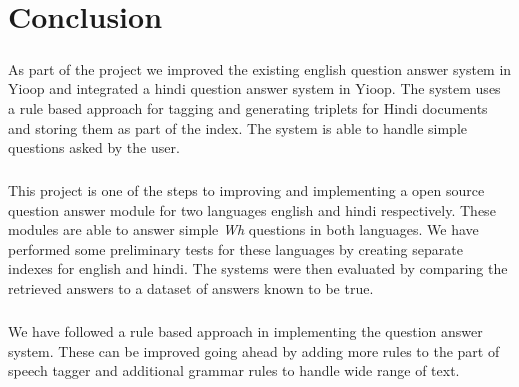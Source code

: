\chapter{Conclusion}

\paragraph{}
As part of the project we improved the existing english question answer system in Yioop and integrated a hindi question answer system in Yioop. The system uses a rule based approach for tagging and generating triplets for Hindi documents and storing them as part of the index. The system is able to handle simple questions asked by the user.

\paragraph{}
This project is one of the steps to improving and implementing a open source question answer module for two languages english and hindi respectively. These modules are able to answer simple \textit{Wh} questions in both languages. We have performed some preliminary tests for these languages by creating separate indexes for english and hindi. The systems were then evaluated by comparing the retrieved answers to a dataset of answers known to be true.

\paragraph{}
We have followed a rule based approach in implementing the question answer system. These can be improved going ahead by adding more rules to the part of speech tagger and additional grammar rules to handle wide range of text.